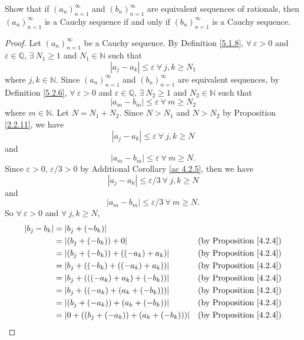 \exercisesection

\begin{exercise}\label{ex 5.2.1}
Show that if \((a_n)_{n = 1}^{\infty}\) and \((b_n)_{n = 1}^{\infty}\) are equivalent sequences of rationals, then \((a_n)_{n = 1}^{\infty}\) is a Cauchy sequence if and only if \((b_n)_{n = 1}^{\infty}\) is a Cauchy sequence.
\end{exercise}

\begin{proof}
Let \((a_n)_{n = 1}^{\infty}\) be a Cauchy sequence.
By Definition \ref{5.1.8}, \(\forall\ \varepsilon > 0\) and \(\varepsilon \in \mathds{Q}\), \(\exists\ N_1 \geq 1\) and \(N_1 \in \mathds{N}\) such that
\[
    |a_j - a_k| \leq \varepsilon \ \forall\ j, k \geq N_1
\]
where \(j, k \in \mathds{N}\).
Since \((a_n)_{n = 1}^{\infty}\) and \((b_n)_{n = 1}^{\infty}\) are equivalent sequences, by Definition \ref{5.2.6}, \(\forall\ \varepsilon > 0\) and \(\varepsilon \in \mathds{Q}\), \(\exists\ N_2 \geq 1\) and \(N_2 \in \mathds{N}\) such that
\[
    |a_m - b_m| \leq \varepsilon \ \forall\ m \geq N_2
\]
where \(m \in \mathds{N}\).
Let \(N = N_1 + N_2\).
Since \(N > N_1\) and \(N > N_2\) by Proposition \ref{2.2.11}, we have
\[
    |a_j - a_k| \leq \varepsilon \ \forall\ j, k \geq N
\]
and
\[
    |a_m - b_m| \leq \varepsilon \ \forall\ m \geq N.
\]
Since \(\varepsilon > 0\), \(\varepsilon / 3 > 0\) by Additional Corollary \ref{ac 4.2.5}, then we have
\[
    |a_j - a_k| \leq \varepsilon / 3 \ \forall\ j, k \geq N
\]
and
\[
    |a_m - b_m| \leq \varepsilon / 3 \ \forall\ m \geq N.
\]
So \(\forall\ \varepsilon > 0\) and \(\forall\ j, k \geq N\),
\begin{align*}
|b_j - b_k| &= |b_j + (-b_k)| \\
&= |(b_j + (-b_k)) + 0| & \text{(by Proposition \ref{4.2.4})} \\
&= |(b_j + (-b_k)) + ((-a_k) + a_k)| & \text{(by Proposition \ref{4.2.4})} \\
&= |b_j + ((-b_k) + ((-a_k) + a_k))| & \text{(by Proposition \ref{4.2.4})} \\
&= |b_j + (((-a_k) + a_k) + (-b_k))| & \text{(by Proposition \ref{4.2.4})} \\
&= |b_j + ((-a_k) + (a_k + (-b_k)))| & \text{(by Proposition \ref{4.2.4})} \\
&= |(b_j + (-a_k)) + (a_k + (-b_k))| & \text{(by Proposition \ref{4.2.4})} \\
&= |0 + ((b_j + (-a_k)) + (a_k + (-b_k)))| & \text{(by Proposition \ref{4.2.4})} \\

\end{align*}
\end{proof}
